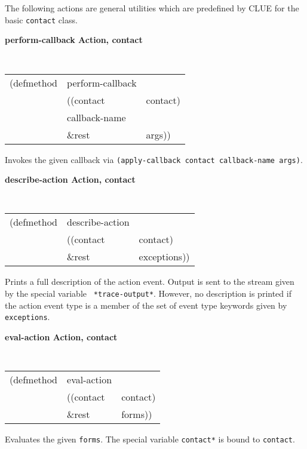 The following actions are general utilities which are predefined by CLUE
for the basic {\tt contact} class.

{\samepage
{\large {\bf perform-callback \hfill Action, contact}}
\begin{flushright} 
\parbox[t]{6.125in}{
\tt
\begin{tabular}{lll}
\raggedright
(defmethod & perform-callback & \\
& ((contact  &contact)\\
& callback-name\\
& \&rest & args))
\end{tabular}
\rm
}\end{flushright}}
\begin{flushright} 
\parbox[t]{6.125in}{
Invokes the given callback via {\tt (apply-callback contact
callback-name args)}. }
\end{flushright}

{\samepage
{\large {\bf describe-action \hfill Action, contact}}
\begin{flushright} 
\parbox[t]{6.125in}{
\tt
\begin{tabular}{lll}
\raggedright
(defmethod & describe-action & \\
& ((contact  &contact)\\
& \&rest & exceptions))
\end{tabular}
\rm
}\end{flushright}}
\begin{flushright} 
\parbox[t]{6.125in}{
Prints a full description of the action event. Output is sent
to the stream given by the special variable {\tt
*trace-output*}.
However, no description is printed if the action event type is a member
of the set of  event type
keywords given by {\tt exceptions}.}\end{flushright}

{\samepage
{\large {\bf eval-action \hfill Action, contact}}
\begin{flushright} 
\parbox[t]{6.125in}{
\tt
\begin{tabular}{lll}
\raggedright
(defmethod & eval-action & \\
& ((contact  &contact)\\
& \&rest & forms))
\end{tabular}
\rm
}\end{flushright}}
\begin{flushright} 
\parbox[t]{6.125in}{
Evaluates the given {\tt forms}.
The special variable {\tt *contact*}
is bound to {\tt contact}.
}\end{flushright}


